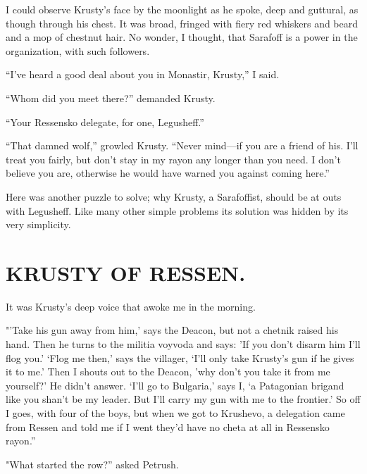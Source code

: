 \documentclass[a5paper,12pt]{book}
\begin{document}
I could observe Krusty’s face by the moonlight as he spoke, deep and guttural, as though through his chest. It was broad, fringed with fiery red whiskers and beard and a mop of chestnut hair. No wonder, I thought, that Sarafoff is a power in the organization, with such followers. 

“I’ve heard a good deal about you in Monastir, Krusty,” I said.

“Whom did you meet there?” demanded Krusty.

“Your Ressensko delegate, for one, Legusheff.”

“That damned wolf,” growled Krusty. “Never mind—if you are a friend of his. I’ll treat you fairly, but don’t stay in my rayon any longer than you need. I don’t believe you are, otherwise he would have warned you against coming here.”

Here was another puzzle to solve; why Krusty, a Sarafoffist, should be at outs with Legusheff. Like many other simple problems its solution was hidden by its very simplicity.


\chapter{KRUSTY OF RESSEN.}

It was Krusty’s deep voice that awoke me in the morning.

"'Take his gun away from him,' says the Deacon, but not a chetnik raised his hand. Then he turns to the militia voyvoda and says: 'If you don’t disarm him I’ll flog you.’ ‘Flog me then,’ says the villager, ‘I’ll only take Krusty’s gun if he gives it to me.’ Then I shouts out to the Deacon, 'why don’t you take it from me yourself?’ He didn’t answer. ‘I’ll go to Bulgaria,’ says I, ‘a Patagonian brigand like you shan’t be my leader. But I’ll carry my gun with me to the frontier.’ So off I goes, with four of the boys, but when we got to Krushevo, a delegation came from Ressen and told me if I went they’d have no cheta at all in Ressensko rayon.”

"What started the row?” asked Petrush.
\end{document}
